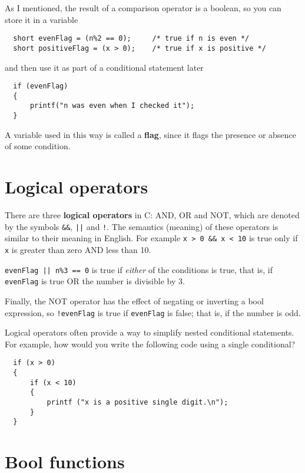 
As I mentioned, the result of a comparison operator is a boolean,
so you can store it in a variable

\begin{verbatim}
  short evenFlag = (n%2 == 0);     /* true if n is even */
  short positiveFlag = (x > 0);    /* true if x is positive */
\end{verbatim}
%
and then use it as part of a conditional statement later

\begin{verbatim}
  if (evenFlag) 
  {
      printf("n was even when I checked it");
  }
\end{verbatim}
%
A variable used in this way is called a {\bf flag},
since it flags the presence or absence of some condition.


\section{Logical operators}

There are three {\bf logical operators} in C: AND, OR and NOT,
which are denoted by the symbols {\tt \&\&}, {\tt ||} and
{\tt !}.  The semantics (meaning) of these operators is similar
to their meaning in English.  For example {\tt x > 0 \&\& x < 10}
is true only if {\tt x} is greater than zero AND less than 10.


{\tt evenFlag || n\%3 == 0} is true if {\em either} of
the conditions is true, that is, if {\tt evenFlag} is true OR the
number is divisible by 3.

Finally, the NOT operator has the effect of negating or
inverting a bool expression, so {\tt !evenFlag} is true
if {\tt evenFlag} is false; that is, if the number is odd.


Logical operators often provide a way to simplify nested
conditional statements.  For example, how would you write
the following code using a single conditional?

\begin{verbatim}
  if (x > 0) 
  {
      if (x < 10) 
      {
          printf ("x is a positive single digit.\n");
      }
  }
\end{verbatim}

\section{Bool functions}
\label{bool}

